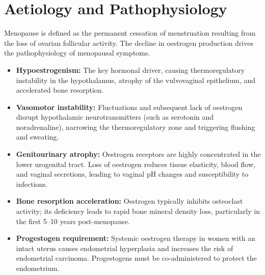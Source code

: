 \section*{Aetiology and Pathophysiology}
Menopause is defined as the permanent cessation of menstruation resulting from the loss of ovarian follicular activity. The decline in oestrogen production drives the pathophysiology of menopausal symptoms.
\begin{itemize}
    \item \textbf{Hypoestrogenism:} The key hormonal driver, causing thermoregulatory instability in the hypothalamus, atrophy of the vulvovaginal epithelium, and accelerated bone resorption.
    \item \textbf{Vasomotor instability:} Fluctuations and subsequent lack of oestrogen disrupt hypothalamic neurotransmitters (such as serotonin and noradrenaline), narrowing the thermoregulatory zone and triggering flushing and sweating.
    \item \textbf{Genitourinary atrophy:} Oestrogen receptors are highly concentrated in the lower urogenital tract. Loss of oestrogen reduces tissue elasticity, blood flow, and vaginal secretions, leading to vaginal pH changes and susceptibility to infections.
    \item \textbf{Bone resorption acceleration:} Oestrogen typically inhibits osteoclast activity; its deficiency leads to rapid bone mineral density loss, particularly in the first 5--10 years post-menopause.
    \item \textbf{Progestogen requirement:} Systemic oestrogen therapy in women with an intact uterus causes endometrial hyperplasia and increases the risk of endometrial carcinoma. Progestogens must be co-administered to protect the endometrium.
\end{itemize}

